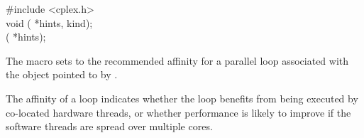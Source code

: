 \begin{ttfamily}
\#include <cplex.h>\\
void ( *hints,  kind);\\
 ( *hints);
\end{ttfamily}

\pnum
The
macro sets to
the recommended affinity
for a parallel loop associated with the object pointed to by
.

\pnum
The affinity of a loop indicates whether the loop benefits
from being executed by co-located hardware threads,
or whether performance is likely to improve if the software threads
are spread over multiple cores.
